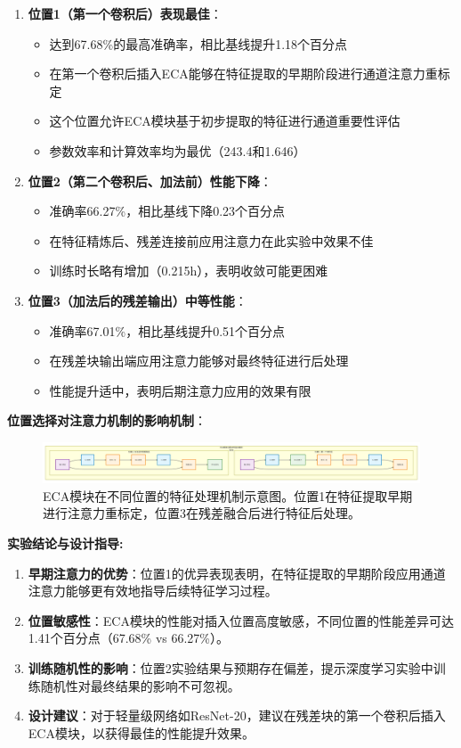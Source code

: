\documentclass[a4paper]{article}
\begin{document}
\begin{enumerate}
    \item \textbf{位置1（第一个卷积后）表现最佳}：
    \begin{itemize}
        \item 达到67.68\%的最高准确率，相比基线提升1.18个百分点
        \item 在第一个卷积后插入ECA能够在特征提取的早期阶段进行通道注意力重标定
        \item 这个位置允许ECA模块基于初步提取的特征进行通道重要性评估
        \item 参数效率和计算效率均为最优（243.4和1.646）
    \end{itemize}
    \item \textbf{位置2（第二个卷积后、加法前）性能下降}：
    \begin{itemize}
        \item 准确率66.27\%，相比基线下降0.23个百分点
        \item 在特征精炼后、残差连接前应用注意力在此实验中效果不佳
        \item 训练时长略有增加（0.215h），表明收敛可能更困难
    \end{itemize}
    \item \textbf{位置3（加法后的残差输出）中等性能}：
    \begin{itemize}
        \item 准确率67.01\%，相比基线提升0.51个百分点
        \item 在残差块输出端应用注意力能够对最终特征进行后处理
        \item 性能提升适中，表明后期注意力应用的效果有限
    \end{itemize}
\end{enumerate}

\textbf{位置选择对注意力机制的影响机制}：

\begin{figure}[H]
    \centering
    \includegraphics[width=\textwidth]{fig/4.png}
    \caption{ECA模块在不同位置的特征处理机制示意图。位置1在特征提取早期进行注意力重标定，位置3在残差融合后进行特征后处理。}
    \label{fig:eca_position_impact}
\end{figure}

\textbf{实验结论与设计指导:}

\begin{enumerate}
    \item \textbf{早期注意力的优势}：位置1的优异表现表明，在特征提取的早期阶段应用通道注意力能够更有效地指导后续特征学习过程。
    \item \textbf{位置敏感性}：ECA模块的性能对插入位置高度敏感，不同位置的性能差异可达1.41个百分点（67.68\% vs 66.27\%）。
    \item \textbf{训练随机性的影响}：位置2实验结果与预期存在偏差，提示深度学习实验中训练随机性对最终结果的影响不可忽视。
    \item \textbf{设计建议}：对于轻量级网络如ResNet-20，建议在残差块的第一个卷积后插入ECA模块，以获得最佳的性能提升效果。
\end{enumerate}
\end{document}
